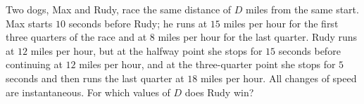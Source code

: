 Two dogs, Max and Rudy, race the same distance of $D$ miles from the same start. Max starts $10$ seconds before Rudy; he runs at $15$ miles per hour for the first three quarters of the race and at $8$ miles per hour for the last quarter. Rudy runs at $12$ miles per hour, but at the halfway point she stops for $15$ seconds before continuing at $12$ miles per hour, and at the three-quarter point she stops for $5$ seconds and then runs the last quarter at $18$ miles per hour. All changes of speed are instantaneous. For which values of $D$ does Rudy win?

